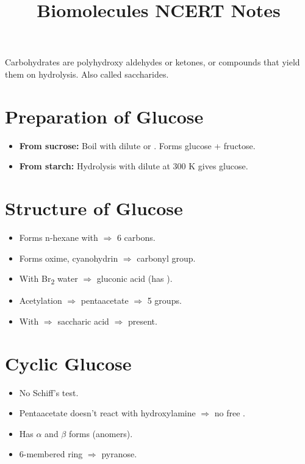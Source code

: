 \documentclass[12pt]{article}
\title{Biomolecules NCERT Notes}
\date{}
\begin{document}
\maketitle

Carbohydrates are polyhydroxy aldehydes or ketones, or compounds that yield them on hydrolysis. Also called saccharides.

\section*{Preparation of Glucose}
\begin{itemize}
  \item \textbf{From sucrose:} Boil with dilute  or . Forms glucose + fructose.
  \item \textbf{From starch:} Hydrolysis with dilute  at 300 K gives glucose.
\end{itemize}

\section*{Structure of Glucose}
\begin{itemize}
  \item Forms n-hexane with  $\Rightarrow$ 6 carbons.
  \item Forms oxime, cyanohydrin $\Rightarrow$ carbonyl group.
  \item With Br\textsubscript{2} water $\Rightarrow$ gluconic acid (has ).
  \item Acetylation $\Rightarrow$ pentaacetate $\Rightarrow$ 5  groups.
  \item With  $\Rightarrow$ saccharic acid $\Rightarrow$  present.
\end{itemize}

\section*{Cyclic Glucose}
\begin{itemize}
  \item No Schiff's test.
  \item Pentaacetate doesn't react with hydroxylamine $\Rightarrow$ no free .
  \item Has $\alpha$ and $\beta$ forms (anomers).
  \item 6-membered ring $\Rightarrow$ pyranose.
\end{itemize}
\end{document}
